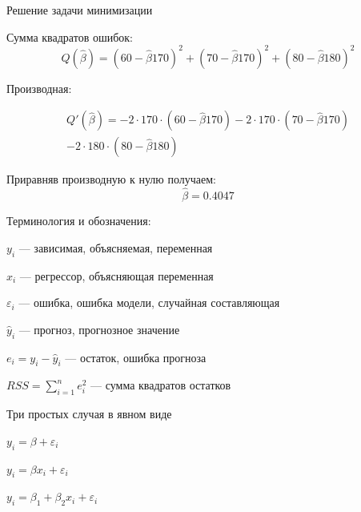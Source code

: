 \documentclass[ignorenonframetext,]{beamer}
\begin{document}
\begin{frame}{Решение задачи минимизации}

Сумма квадратов ошибок: \[
Q(\hat{\beta})=(60-\hat{\beta}170)^2+(70-\hat{\beta}170)^2+(80-\hat{\beta}180)^2
\]

Производная:

\begin{multline}
Q'(\hat{\beta})=-2\cdot 170\cdot (60-\hat{\beta}170)-2\cdot 170\cdot(70-\hat{\beta}170)\\
-2\cdot 180\cdot(80-\hat{\beta}180)
\end{multline}

Приравняв производную к нулю получаем: \[
\hat{\beta}=0.4047
\]

\end{frame}

\begin{frame}{Терминология и обозначения:}

$y_i$ --- зависимая, объясняемая, переменная

$x_i$ --- регрессор, объясняющая переменная

$\varepsilon_i$ --- ошибка, ошибка модели, случайная составляющая

$\hat{y}_i$ --- прогноз, прогнозное значение

$e_i=y_i-\hat{y}_i$ --- остаток, ошибка прогноза

$RSS=\sum_{i=1}^n e_i^2$ --- сумма квадратов остатков

\end{frame}

\begin{frame}{Три простых случая в явном виде}

\begin{block}{$y_i=\beta+\varepsilon_i$}

\end{block}

\begin{block}{$y_i=\beta x_i+\varepsilon_i$}

\end{block}

\begin{block}{$y_i=\beta_1+\beta_2 x_i+\varepsilon_i$}

\end{block}

\end{frame}
\end{document}
